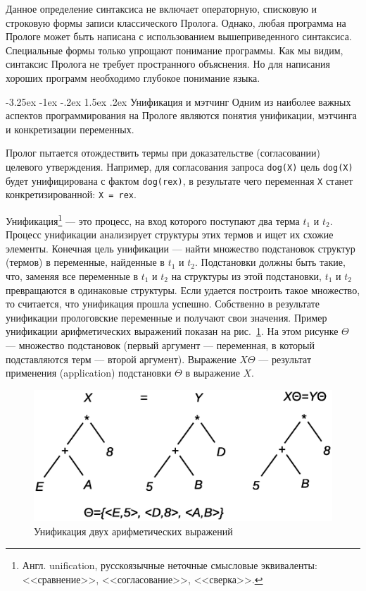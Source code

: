 \documentclass[12pt, openany, twoside]{book} %
\makeatletter
\renewcommand\section{\@startsection {section}{1}{\z@}%
                                   {-3.25ex \@plus -1ex \@minus -.2ex}%
                                   {1.5ex \@plus.2ex}%
                                   {\normalfont\large\bfseries}}
\makeatother
\begin{document}
Данное определение синтаксиса не включает операторную, списковую и строковую формы записи классического Пролога. Однако, любая программа на Прологе может быть написана с использованием вышеприведенного синтаксиса. Специальные формы  только упрощают понимание программы. Как мы видим, синтаксис Пролога не требует пространного объяснения. Но для написания хороших программ необходимо глубокое понимание языка.

\section{Унификация и мэтчинг} Одним из наиболее важных аспектов программирования на Прологе являются понятия унификации, мэтчинга и конкретизации переменных.

Пролог пытается отождествить термы при доказательстве (согласовании) целевого утверждения. Например, для согласования запроса {\tt  dog(X)} цель {\tt  dog(X)} будет унифицирована с фактом {\tt dog(rex)}, в результате чего переменная {\tt Х} станет конкретизированной: {\tt Х = rex}.

Унификация\footnote{Англ. unification, русскоязычные неточные смысловые эквиваленты: <<сравнение>>, <<согласование>>, <<сверка>>.} --- это процесс, на вход которого поступают два терма $t_1$ и $t_2$. Процесс унификации анализирует структуры этих термов и ищет их схожие элементы. Конечная цель унификации --- найти множество подстановок структур (термов) в переменные, найденные в $t_1$ и $t_2$. Подстановки должны быть такие, что, заменяя все переменные в $t_1$ и $t_2$ на структуры из этой подстановки, $t_1$ и $t_2$ превращаются в одинаковые структуры. Если удается построить такое множество, то считается, что унификация прошла успешно. Собственно в результате унификации прологовские переменные и получают свои значения. Пример унификации арифметических выражений показан на рис.~\ref{pic:unification}. На этом рисунке $\Theta$ --- множество подстановок (первый аргумент --- переменная, в который подставляются терм --- второй аргумент). Выражение $X\Theta$ --- результат применения (application) подстановки $\Theta$ в выражение $X$.
\begin{figure}[hbt]
\begin{center}
\includegraphics[scale=0.5]{pics/unification.eps}
\end{center}
\caption{Унификация двух арифметических выражений}
\label{pic:unification}
\end{figure}
\end{document}
